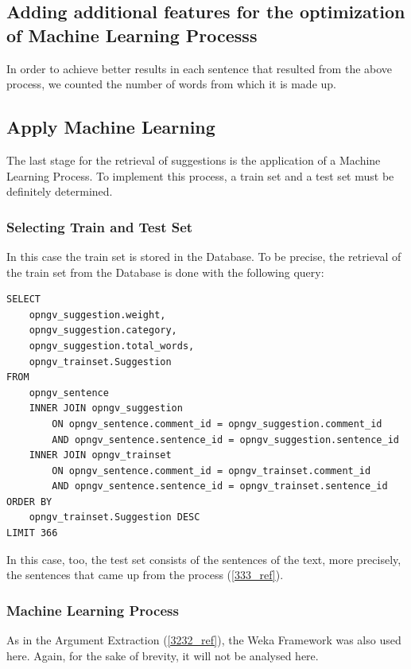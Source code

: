 \subsection{Adding additional features for the optimization of Machine Learning Processs}\label{334_ref}
In order to achieve better results in each sentence that resulted from the above process, we counted the number of words from which it is made up.

\subsection{Apply Machine Learning}\label{335_ref}
The last stage for the retrieval of suggestions is the application of a Machine Learning Process. To implement this process, a train set and a test set must be definitely determined.

\subsubsection{Selecting Train and Test Set}\label{3351_ref}
In this case the train set is stored in the Database. To be precise, the retrieval of the train set from the Database is done with the following query:\\
\newpage
\lstset{language=SQL}
\begin{lstlisting}[frame=single, basicstyle=\small]
SELECT
	opngv_suggestion.weight,
	opngv_suggestion.category,
	opngv_suggestion.total_words,
	opngv_trainset.Suggestion
FROM
	opngv_sentence
	INNER JOIN opngv_suggestion
		ON opngv_sentence.comment_id = opngv_suggestion.comment_id
		AND opngv_sentence.sentence_id = opngv_suggestion.sentence_id
	INNER JOIN opngv_trainset
		ON opngv_sentence.comment_id = opngv_trainset.comment_id
		AND opngv_sentence.sentence_id = opngv_trainset.sentence_id
ORDER BY
	opngv_trainset.Suggestion DESC
LIMIT 366
\end{lstlisting}

In this case, too, the test set consists of the sentences of the text, more precisely, the sentences that came up from the process (\ref{333_ref}).

\subsubsection{Machine Learning Process}\label{3352_ref}
As in the Argument Extraction (\ref{3232_ref}), the Weka Framework was also used here. Again, for the sake of brevity, it will not be analysed here.


